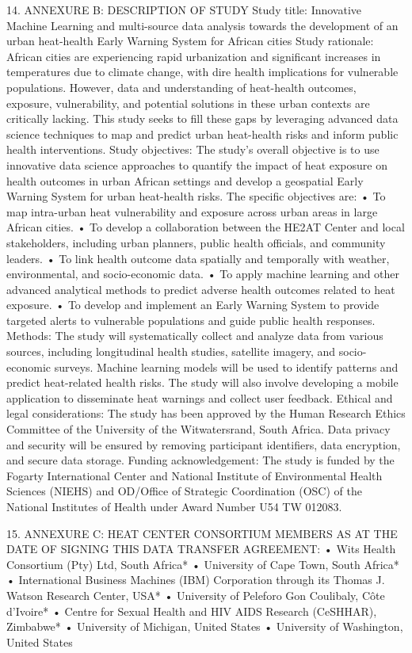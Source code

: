 \documentclass[12pt,letterpaper]{article}
\begin{document}
14.	ANNEXURE B: DESCRIPTION OF STUDY Study title: Innovative Machine Learning and multi-source data analysis towards the development of an urban heat-health Early Warning System for African cities  Study rationale: African cities are experiencing rapid urbanization and significant increases in temperatures due to climate change, with dire health implications for vulnerable populations. However, data and understanding of heat-health outcomes, exposure, vulnerability, and potential solutions in these urban contexts are critically lacking. This study seeks to fill these gaps by leveraging advanced data science techniques to map and predict urban heat-health risks and inform public health interventions. Study objectives: The study's overall objective is to use innovative data science approaches to quantify the impact of heat exposure on health outcomes in urban African settings and develop a geospatial Early Warning System for urban heat-health risks. The specific objectives are: •	To map intra-urban heat vulnerability and exposure across urban areas in large African cities. •	To develop a collaboration between the HE2AT Center and local stakeholders, including urban planners, public health officials, and community leaders. •	To link health outcome data spatially and temporally with weather, environmental, and socio-economic data. •	To apply machine learning and other advanced analytical methods to predict adverse health outcomes related to heat exposure. •	To develop and implement an Early Warning System to provide targeted alerts to vulnerable populations and guide public health responses. Methods: The study will systematically collect and analyze data from various sources, including longitudinal health studies, satellite imagery, and socio-economic surveys. Machine learning models will be used to identify patterns and predict heat-related health risks. The study will also involve developing a mobile application to disseminate heat warnings and collect user feedback. Ethical and legal considerations: The study has been approved by the Human Research Ethics Committee of the University of the Witwatersrand, South Africa. Data privacy and security will be ensured by removing participant identifiers, data encryption, and secure data storage. Funding acknowledgement: The study is funded by the Fogarty International Center and National Institute of Environmental Health Sciences (NIEHS) and OD/Office of Strategic Coordination (OSC) of the National Institutes of Health under Award Number U54 TW 012083.

15.	ANNEXURE C: HEAT CENTER CONSORTIUM MEMBERS AS AT THE DATE OF SIGNING THIS DATA TRANSFER AGREEMENT: •	Wits Health Consortium (Pty) Ltd, South Africa* •	University of Cape Town, South Africa* •	International Business Machines (IBM) Corporation through its Thomas J. Watson Research Center, USA* •	University of Peleforo Gon Coulibaly, Côte d’Ivoire* •	Centre for Sexual Health and HIV AIDS Research (CeSHHAR), Zimbabwe* •	University of Michigan, United States •	University of Washington, United States
\end{document}
